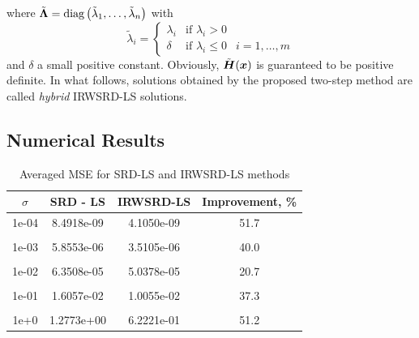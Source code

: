 where $\tilde{\mbox{\boldmath{$\Lambda$}}}=\mbox{diag}\left(\tilde{\lambda}_1,\ldots,\tilde{\lambda}_n\right)$ with
\begin{equation}
\nonumber
\tilde{\lambda}_i=\left\{\begin{array} {lll}
    \lambda_i & \mbox{if } \lambda_i>0 & \\
    \delta &  \mbox{if } \lambda_i\leq0 & i=1,\ldots,m \end{array} \right.
\end{equation}
and $\delta$ a small positive constant. Obviously, $\tilde{\mbox{\boldmath$H$}}(\mbox{\boldmath$x$})$ is guaranteed to be positive definite. In what follows, solutions obtained by the proposed two-step method are called \textit{hybrid} IRWSRD-LS solutions.

\subsection{Numerical Results}

\begin{table}
\centering
\caption{Averaged MSE for SRD-LS and IRWSRD-LS methods}
\begin{tabular}{|c|c|c|c|}
\hline
$\sigma$ & SRD - LS&IRWSRD-LS& Improvement, \%\\ \hline
1e-04&	8.4918e-09&	4.1050e-09& 51.7\\ &&&\\
1e-03&	5.8553e-06&	3.5105e-06& 40.0\\ &&&\\
1e-02&	6.3508e-05&	5.0378e-05& 20.7\\ &&&\\
1e-01&	1.6057e-02&	1.0055e-02& 37.3\\ &&&\\
1e+0&	1.2773e+00&	6.2221e-01& 51.2\\ %
\hline
\end{tabular}
\label{tab:3}
\end{table}


